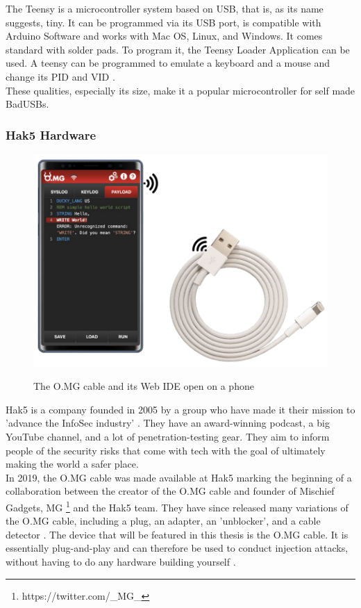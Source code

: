 The Teensy  \cite{TeensyUSBDevelopment} is a microcontroller system based on USB, that is, as its name suggests, tiny. It can be programmed via its USB port, is compatible with Arduino Software and works with Mac OS, Linux, and Windows. It comes standard with solder pads. To program it, the Teensy Loader Application can be used.
A teensy can be programmed to emulate a keyboard and a mouse and change its PID and VID \cite{farhiMalboardNovelUser2019}.\\
These qualities, especially its size, make it a popular microcontroller for self made BadUSBs. 


\subsubsection{Hak5 Hardware} \label{Hak5Hardware}

\begin{figure}[H]
    \centering
    \includegraphics[width=0.5\linewidth]{visuals/OMGCable.png}
    \caption{The O.MG cable and its Web IDE open on a phone}
    \label{fig:OMGCable}
    \cite{hak5MGCable}
\end{figure}

Hak5 is a company founded in 2005 by a group who have made it their mission to 'advance the InfoSec industry' \cite{hak5}. They have an award-winning podcast, a big YouTube channel, and a lot of penetration-testing gear. They aim to inform people of the security risks that come with tech with the goal of ultimately making the world a safer place. \\
In 2019, the O.MG cable was made available at Hak5 \cite{MGCable2019a} marking the beginning of a collaboration between the creator of the O.MG cable and founder of Mischief Gadgets, MG \footnote{https://twitter.com/_MG_} and the Hak5 team. They have since released many variations of the O.MG cable, including a plug, an adapter, an 'unblocker', and a cable detector \cite{hak5MischiefGadgets}. The device that will be featured in this thesis is the O.MG cable. It is essentially plug-and-play and can therefore be used to conduct injection attacks, without having to do any hardware building yourself \cite{hak5MGCable}. 



